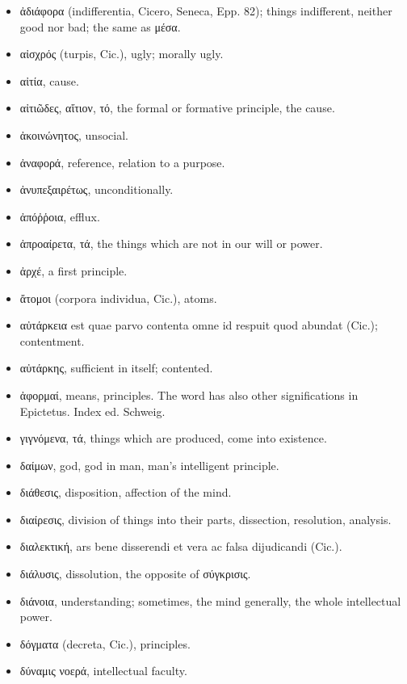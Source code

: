 \renewcommand\labelitemi{}
\begin{itemize}[leftmargin=*]
\setlength\itemsep{0em}
\item
  \textgreek{ἀδιάφορα} (indifferentia, Cicero, Seneca, Epp. 82); things indifferent,
  neither good nor bad; the same as \textgreek{μέσα}.
\item
  \textgreek{αἰσχρός} (turpis, Cic.), ugly; morally ugly.
\item
  \textgreek{αἰτία}, cause.
\item
  \textgreek{αἰτιῶδες, αἴτιον, τό}, the formal or formative principle, the cause.
\item
  \textgreek{ἀκοινώνητος}, unsocial.
\item
  \textgreek{ἀναφορά}, reference, relation to a purpose.
\item
  \textgreek{ἀνυπεξαιρέτως}, unconditionally.
\item
  \textgreek{ἀπόῤῥοια}, efflux.
\item
  \textgreek{ἀπροαίρετα, τά}, the things which are not in our will or power.
\item
  \textgreek{ἀρχέ}, a first principle.
\item
  \textgreek{ἄτομοι} (corpora individua, Cic.), atoms.
\item
  \textgreek{αὐτάρκεια} est quae parvo contenta omne id respuit quod abundat (Cic.);
  contentment.
\item
  \textgreek{αὐτάρκης}, sufficient in itself; contented.
\item
  \textgreek{ἀφορμαί}, means, principles. The word has also other significations in
  Epictetus. Index ed. Schweig.
\end{itemize}

\begin{itemize}[leftmargin=*]
\setlength\itemsep{0em}
\item
  \textgreek{γιγνόμενα, τά}, things which are produced, come into existence.
\end{itemize}

\begin{itemize}[leftmargin=*]
\setlength\itemsep{0em}
\item
  \textgreek{δαίμων}, god, god in man, man's intelligent principle.
\item
  \textgreek{διάθεσις}, disposition, affection of the mind.
\item
  \textgreek{διαίρεσις}, division of things into their parts, dissection,
  resolution, analysis.
\item
  \textgreek{διαλεκτική}, ars bene disserendi et vera ac falsa dijudicandi (Cic.).
\item
  \textgreek{διάλυσις}, dissolution, the opposite of \textgreek{σύγκρισις}.
\item
  \textgreek{διάνοια}, understanding; sometimes, the mind generally, the whole
  intellectual power.
\item
  \textgreek{δόγματα} (decreta, Cic.), principles.
\item
  \textgreek{δύναμις νοερά}, intellectual faculty.
\end{itemize}

